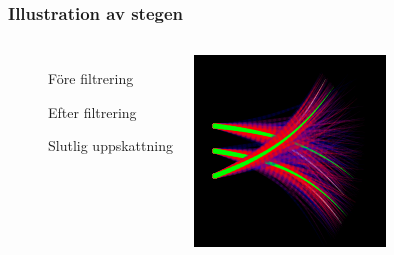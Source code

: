 \documentclass[]{beamer}
\renewcommand{\oe}{\"{o}}
\begin{document}
\begin{frame}
  \frametitle{Illustration av stegen}
  \begin{columns}[c]
    \column{2.5in}

    \begin{description}
      \item[] F\oe re filtrering
      \item[]
      \item[] Efter filtrering
      \item[]
      \item[] Slutlig uppskattning
    \end{description}
    
    \column{2in}
    
    \begin{center}
      \includegraphics[width=1\textwidth]{tracking-particles.png}
    \end{center}
  \end{columns}
\end{frame}
\end{document}
